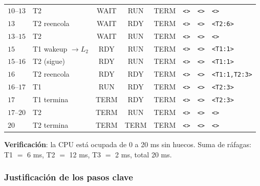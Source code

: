 \documentclass[11pt,a4paper]{article}
\begin{document}
\begin{center}
\begin{tabular}{@{}llcccp{2.5cm}p{1.85cm}p{1.7cm}@{}}
$10$--$13$& T2             & WAIT & RUN  & TERM & \texttt{<>}                & \texttt{<>}        & \texttt{<>}      \\
$13$      & T2 reencola    & WAIT & RDY  & TERM & \texttt{<>}                & \texttt{<>}        & \texttt{<T2:6>}  \\
$13$--$15$& T2             & WAIT & RUN  & TERM & \texttt{<>}                & \texttt{<>}        & \texttt{<>}      \\
$15$      & T1 wakeup $\to L_2$ & RDY & RUN & TERM & \texttt{<>}             & \texttt{<>}        & \texttt{<T1:1>}  \\
$15$--$16$& T2 (sigue)     & RDY  & RUN  & TERM & \texttt{<>}                & \texttt{<>}        & \texttt{<T1:1>}  \\
$16$      & T2 reencola    & RDY  & RDY  & TERM & \texttt{<>}                & \texttt{<>}        & \texttt{<T1:1,T2:3>} \\
$16$--$17$& T1             & RUN  & RDY  & TERM & \texttt{<>}                & \texttt{<>}        & \texttt{<T2:3>}  \\
$17$      & T1 termina     & TERM & RDY  & TERM & \texttt{<>}                & \texttt{<>}        & \texttt{<T2:3>}  \\
$17$--$20$& T2             & TERM & RUN  & TERM & \texttt{<>}                & \texttt{<>}        & \texttt{<>}      \\
$20$      & T2 termina     & TERM & TERM & TERM & \texttt{<>}                & \texttt{<>}        & \texttt{<>}      \\
\bottomrule
\end{tabular}
\end{center}

\textbf{Verificación}: la CPU está ocupada de 0 a 20 ms sin huecos.
Suma de ráfagas: T1 $=$ 6 ms, T2 $=$ 12 ms, T3 $=$ 2 ms, total 20 ms.

\subsubsection*{Justificación de los pasos clave}
\end{document}
